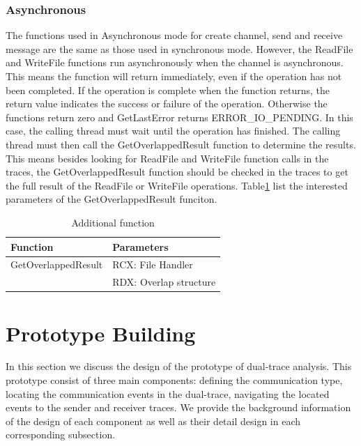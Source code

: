 \documentclass[paper=a4, fontsize=11pt]{scrartcl}
\numberwithin{equation}{section}		%
\numberwithin{figure}{section}			%
\numberwithin{table}{section}				%
\begin{document}
\subsubsection{Asynchronous}
The functions used in Asynchronous mode for create channel, send and receive message are the same as those used in synchronous mode. However,  the ReadFile and WriteFile functions run asynchronously when the channel is asynchronous. This means the function will return immediately, even if the operation has not been completed. If the operation is complete when the function returns, the return value indicates the success or failure of the operation. Otherwise the functions return zero and GetLastError returns ERROR\_IO\_PENDING. In this case, the calling thread must wait until the operation has finished. The calling thread must then call the GetOverlappedResult function to determine the results. This means besides looking for ReadFile and WriteFile function calls in the traces, the GetOverlappedResult function should be checked in the traces to get the full result of the ReadFile or WriteFile operations. Table\ref{asynfunctions} list the interested parameters of the GetOverlappedResult funciton.
\begin{table}[h]
        \centering
        \caption{Additional function}
        \label{asynfunctions}
        \begin{tabular}{|l|l|}
        \hline
             Function & Parameters \\
             \hline
             GetOverlappedResult& RCX: File Handler \\
             \cline{2-2} 
             &RDX: Overlap structure\\
            \hline
        \end{tabular}
    \end{table}



\section{Prototype Building}
In this section we discuss the design of the prototype of dual-trace analysis. This prototype consist of three main components: defining the communication type, locating the communication events in the dual-trace, navigating the located events to the sender and receiver traces. We provide the background information of the design of each component as well as their detail design in each corresponding subsection.
\end{document}
